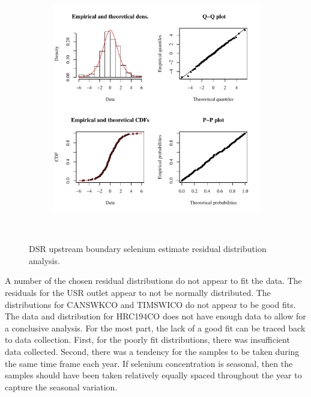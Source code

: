 \subfiguremid
\begin{landscape}
	\begin{figure}
		\begin{subfigure}{0.7\textwidth}
			\centering
			\includegraphics[width=\tableCustomSize]{"Figures/Results_DSR/Stochastic/Conc Model res-fit DDIV"}
		\end{subfigure}\\
		\caption{DSR upstream boundary selenium estimate residual distribution analysis.}
	\end{figure}
\end{landscape}
\subfiguretop

A number of the chosen residual distributions do not appear to fit the data.  The residuals for the USR outlet appear to not be normally distributed.  The distributions for CANSWKCO and TIMSWICO do not appear to be good fits.  The data and distribution for HRC194CO does not have enough data to allow for a conclusive analysis.  For the most part, the lack of a good fit can be traced back to data collection.  First, for the poorly fit distributions, there was insufficient data collected.  Second, there was a tendency for the samples to be taken during the same time frame each year.  If selenium concentration is seasonal, then the samples should have been taken relatively equally spaced throughout the year to capture the seasonal variation.

